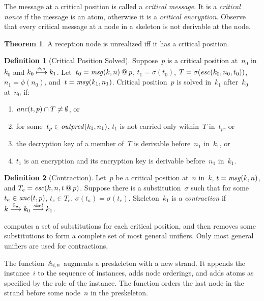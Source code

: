 \documentclass[12pt]{article}
\theoremstyle{definition}
\newtheorem{defn}{Definition}[section]
\newtheorem{thm}{Theorem}[section]
\begin{document}
The message at a critical position is called a \emph{critical
  message}.  It is a \emph{critical nonce} if the message is an atom,
otherwise it is a \emph{critical encryption}.  Observe that every
critical message at a node in a skeleton is not derivable at the node.

\begin{thm}
A reception node is unrealized iff it has a critical position.
\end{thm}

\begin{defn}[Critical Position Solved]\label{def:critical position solved}
Suppose~$p$ is a critical position at~$n_0$ in~$k_0$ and
$k_0\stackrel{\phi,\sigma}{\longmapsto}k_1$.  Let~$t_0=\operatorname{\mathit{msg}}(k,n)\mathbin{@} p$,
$t_1=\sigma(t_0)$,
$T=\sigma(\operatorname{\mathit{esc}}(k_0,n_0,t_0))$, $n_1=\phi(n_0)$,
and~$t=\operatorname{\mathit{msg}}(k_1,n_1)$.  Critical position~$p$ is solved in~$k_1$
after~$k_0$ at~$n_0$ if:
\begin{enumerate}
\item $\operatorname{\mathit{anc}}(t,p)\cap T\neq\emptyset$, or
\item for some~$t_p\in\operatorname{\mathit{outpred}}(k_1,n_1)$, $t_1$ is not carried
  only within~$T$ in~$t_p$, or
\item the decryption key of a member of~$T$ is derivable
  before~$n_1$ in~$k_1$, or
\item $t_1$ is an encryption and its encryption key is derivable
  before~$n_1$ in~$k_1$.
\end{enumerate}
\end{defn}

\begin{defn}[Contraction]\label{def:contraction}
Let~$p$ be a critical position at~$n$ in~$k$, $t=\operatorname{\mathit{msg}}(k,n)$, and
$T_e= \operatorname{\mathit{esc}}(k,n,t\mathbin{@} p)$.  Suppose there is a
substitution~$\sigma$ such that for some~$t_a\in\operatorname{\mathit{anc}}(t,p)$,
$t_e\in T_e$, $\sigma(t_a)=\sigma(t_e)$.
Skeleton~$k_1$ is a \emph{contraction} if
$k\stackrel{\mathbb S_\sigma}{\longrightarrow}k_0\stackrel{\operatorname{\mathit{skel}}}{\longrightarrow}k_1$.
\end{defn}

{\cpsa} computes a set of substitutions for each critical position, and
then removes some substitutions to form a complete set of most
general unifiers.  Only most general unifiers are used for
contractions.

The function~$\mathbb A_{i,n}$ augments a preskeleton with a new strand.
It appends the instance~$i$ to the sequence of instances, adds node
orderings, and adds atoms as specified by the role of the instance.
The function orders the last node in the strand before some node~$n$
in the preskeleton.
\end{document}
